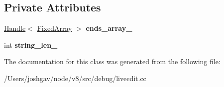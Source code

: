 \subsection*{Private Attributes}
\begin{DoxyCompactItemize}
\item 
\hyperlink{classv8_1_1internal_1_1_handle}{Handle}$<$ \hyperlink{classv8_1_1internal_1_1_fixed_array}{Fixed\+Array} $>$ {\bfseries ends\+\_\+array\+\_\+}\hypertarget{classv8_1_1internal_1_1_line_ends_wrapper_a4bed728ea96a464ba0b0cd9fecbf1b73}{}\label{classv8_1_1internal_1_1_line_ends_wrapper_a4bed728ea96a464ba0b0cd9fecbf1b73}

\item 
int {\bfseries string\+\_\+len\+\_\+}\hypertarget{classv8_1_1internal_1_1_line_ends_wrapper_a3d809b904b8a085671aea9d3edd92568}{}\label{classv8_1_1internal_1_1_line_ends_wrapper_a3d809b904b8a085671aea9d3edd92568}

\end{DoxyCompactItemize}


The documentation for this class was generated from the following file\+:\begin{DoxyCompactItemize}
\item 
/\+Users/joshgav/node/v8/src/debug/liveedit.\+cc\end{DoxyCompactItemize}
